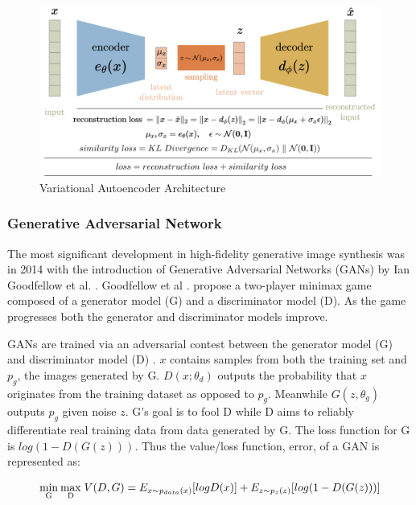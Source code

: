 \documentclass[%
 reprint,
 amsmath,amssymb,
 aps,
]{revtex4-2}
\begin{document}
\begin{figure}[h]
    \includegraphics[width=0.9\columnwidth]{vae.png}
    \caption{\label{fig:vae} Variational Autoencoder Architecture \cite{rocca_2021}}
\end{figure}

\subsubsection{Generative Adversarial Network}
\label{VG}
The most significant development in high-fidelity generative image synthesis was in 2014 with the introduction of  Generative Adversarial Networks (GANs) by Ian Goodfellow et al. \cite{goodfellow2014generative}. Goodfellow et al . propose a two-player minimax game composed of a generator model (G) and a discriminator model (D). As the game progresses both the generator and discriminator models improve.


GANs are trained via an adversarial contest between the generator model (G) and discriminator model (D) \cite{goodfellow2014generative}. $x$ contains samples from both the training set and $p_g$, the images generated by G. $D(x;\theta_d)$ outputs the probability that $x$ originates from the training dataset as opposed to $p_g$. Meanwhile $G(z, \theta_g)$ outputs $p_g$ given noise $z$. G's goal is to fool D while D aims to reliably differentiate real training data from data generated by G. The loss function for G is $log(1 - D(G(z)))$. Thus the value/loss function, error, of a GAN is represented as:
\begin{widetext}
\begin{equation}
\mathrm{\underset{G}{min} \:\underset{D}{max} } \;V (D, G) = E_{x\sim p_{data}(x)} [log D(x)] \\
+ E_{z\sim p_{z}(z)} [log(1 - D(G(z)))]
\end{equation}
\end{widetext}
\end{document}
